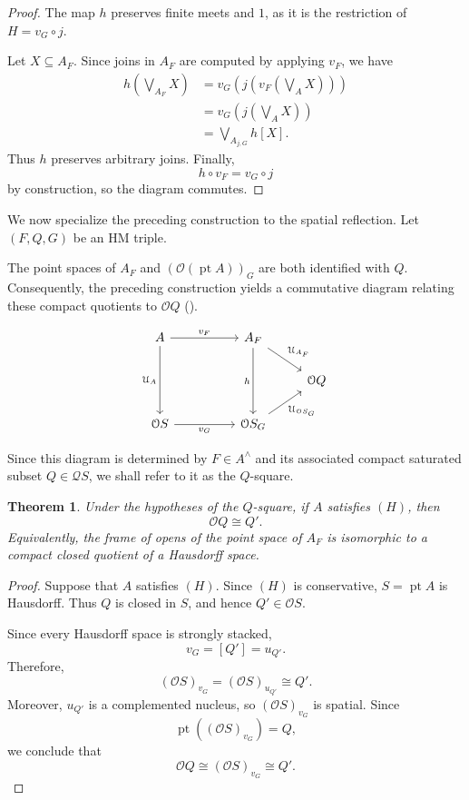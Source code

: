 \documentclass[11pt]{amsart}
\DeclareMathOperator{\pt}{pt}
\theoremstyle{plain}
\newtheorem{thm}{Theorem}[section]
\theoremstyle{definition}
\begin{document}
\begin{proof}
The map $h$ preserves finite meets and $1$,
as it is the restriction of $H=v_G\circ j$.

Let $X\subseteq A_F$. Since joins in $A_F$
are computed by applying $v_F$, we have
\[
\begin{aligned}
h\left(\bigvee_{A_F}X\right)
&=v_G\left(j\left(v_F\left(
  \bigvee_A X\right)\right)\right)\\
&=v_G\left(j\left(\bigvee_A X\right)\right)\\
&=\bigvee_{A_{j,G}}h[X].
\end{aligned}
\]
Thus $h$ preserves arbitrary joins.
Finally,
\[
h\circ v_F=v_G\circ j
\]
by construction, so the diagram commutes.
\end{proof}

We now specialize the preceding construction
to the spatial reflection. Let $(F, Q, G)$ 
be an HM triple.

The point spaces of $A_F$ and
$(\mathcal O(\pt A))_G$ are both identified
with $Q$. Consequently, the preceding
construction yields a commutative diagram
relating these compact quotients to
$\mathcal OQ$ (\cite[Lemma 5.7.1]{sexton2003}).

\begin{equation}\label{Qcuadrado}
\begin{tikzcd}
	A && {A_F} & \\
	&&& {\mathcal{O}Q} \\
	{\mathcal{O}S} && {\mathcal{O}S_G}
	\arrow["{v_F}", from=1-1, to=1-3]
	\arrow["{\mathcal{U}_A}"', from=1-1, to=3-1]
	\arrow["{\mathcal{U}_{A_F}}", from=1-3, to=2-4]
	\arrow["h"', from=1-3, to=3-3]
	\arrow["{v_G}"', from=3-1, to=3-3]
	\arrow["{\mathcal{U}_{\mathcal{O}S_G}}"', from=3-3, to=2-4]
\end{tikzcd}
\end{equation}

Since this diagram is determined by \(F\in A^\wedge\) and its
associated compact saturated subset \(Q\in\mathcal{Q}S\), we shall
refer to it as the \(Q\)-square.

\begin{thm}\label{haus1}
Under the hypotheses of the $Q$-square,
if $A$ satisfies $(H)$, then
\[
\mathcal OQ\cong Q'.
\]
Equivalently, the frame of opens of the
point space of $A_F$ is isomorphic to
a compact closed quotient of a Hausdorff
space.
\end{thm}

\begin{proof}
Suppose that $A$ satisfies $(H)$.
Since $(H)$ is conservative,
$S=\pt A$ is Hausdorff. Thus $Q$ is
closed in $S$, and hence $Q'\in\mathcal OS$.

Since every Hausdorff space is strongly
stacked,
\[
v_G=[Q']=u_{Q'}.
\]
Therefore,
\[
(\mathcal OS)_{v_G}
=(\mathcal OS)_{u_{Q'}}
\cong Q'.
\]
Moreover, $u_{Q'}$ is a complemented
nucleus, so $(\mathcal OS)_{v_G}$ is
spatial. Since
\[
\pt((\mathcal OS)_{v_G})=Q,
\]
we conclude that
\[
\mathcal OQ\cong
(\mathcal OS)_{v_G}\cong Q'.
\]
\end{proof}
\end{document}
